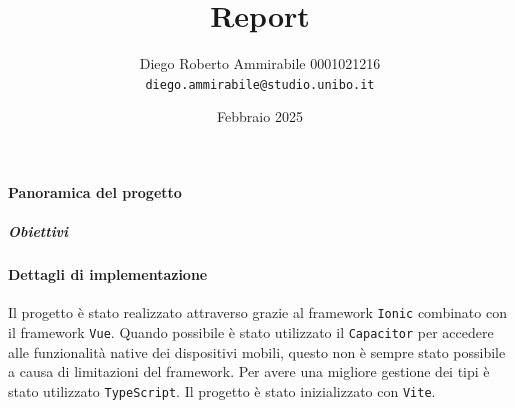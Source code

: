 \documentclass[a4paper]{article}
\author{Diego Roberto Ammirabile 0001021216 \\ \texttt{diego.ammirabile@studio.unibo.it}}
\date{Febbraio 2025}
\title{Report}
\begin{document}
\maketitle
\tableofcontents
\paragraph{Panoramica del progetto}
\subparagraph{Obiettivi}

\paragraph{Dettagli di implementazione}
Il progetto è stato realizzato attraverso grazie al framework \texttt{Ionic} combinato con il framework \texttt{Vue}. Quando possibile è stato utilizzato il \texttt{Capacitor} per accedere alle funzionalità native dei dispositivi mobili, questo non è sempre stato possibile a causa di limitazioni del framework. Per avere una migliore gestione dei tipi è stato utilizzato \texttt{TypeScript}. Il progetto è stato inizializzato con \texttt{Vite}.
\end{document}
